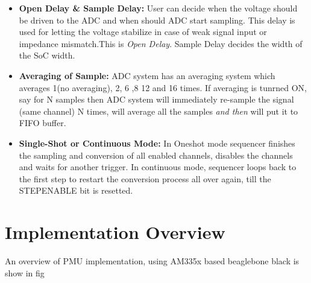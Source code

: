 \begin{itemize}
	\item \textbf{Open Delay \& Sample Delay:} User can decide when the voltage should be driven to the ADC and when should ADC start sampling. This delay is used for letting the voltage stabilize in case of weak signal input or impedance mismatch.This is \textit{Open Delay}. Sample Delay decides the width of the SoC width.
	\item \textbf{Averaging of Sample:} ADC system has an averaging system which averages 1(no averaging), 2, 6 ,8 12 and 16 times. If averaging is tunrned ON, say for N samples then ADC system will immediately re-sample the signal (same channel) N times, will average all the samples \textit{and then} will put it to FIFO buffer.
	\item \textbf{Single-Shot or Continuous Mode:} In Oneshot mode sequencer finishes the sampling and conversion of all enabled channels, disables the channels and waits for another trigger. In continuous mode, sequencer loops back to the first step to restart the conversion process all over again, till the STEPENABLE bit is resetted.    
\end{itemize} 

\section{Implementation Overview}
An overview of PMU implementation, using AM335x based beaglebone black is show in fig 
\begin{figure}
	
\end{figure}

 